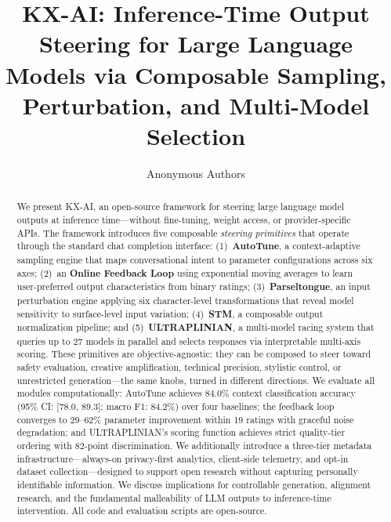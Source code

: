 \documentclass[11pt]{article}
\title{KX-AI: Inference-Time Output Steering for Large Language Models via Composable Sampling, Perturbation, and Multi-Model Selection}
\author{
  Anonymous Authors
}
\begin{document}
\maketitle

\begin{abstract}
We present \textsc{KX-AI}, an open-source framework for steering large language model outputs at inference time---without fine-tuning, weight access, or provider-specific APIs. The framework introduces five composable \emph{steering primitives} that operate through the standard chat completion interface: (1)~\textbf{AutoTune}, a context-adaptive sampling engine that maps conversational intent to parameter configurations across six axes; (2)~an \textbf{Online Feedback Loop} using exponential moving averages to learn user-preferred output characteristics from binary ratings; (3)~\textbf{Parseltongue}, an input perturbation engine applying six character-level transformations that reveal model sensitivity to surface-level input variation; (4)~\textbf{STM}, a composable output normalization pipeline; and (5)~\textbf{ULTRAPLINIAN}, a multi-model racing system that queries up to 27 models in parallel and selects responses via interpretable multi-axis scoring. These primitives are objective-agnostic: they can be composed to steer toward safety evaluation, creative amplification, technical precision, stylistic control, or unrestricted generation---the same knobs, turned in different directions. We evaluate all modules computationally: AutoTune achieves 84.0\% context classification accuracy (95\% CI: [78.0, 89.3]; macro F1: 84.2\%) over four baselines; the feedback loop converges to 29--62\% parameter improvement within 19 ratings with graceful noise degradation; and ULTRAPLINIAN's scoring function achieves strict quality-tier ordering with 82-point discrimination. We additionally introduce a three-tier metadata infrastructure---always-on privacy-first analytics, client-side telemetry, and opt-in dataset collection---designed to support open research without capturing personally identifiable information. We discuss implications for controllable generation, alignment research, and the fundamental malleability of LLM outputs to inference-time intervention. All code and evaluation scripts are open-source.
\end{abstract}

\end{document}
